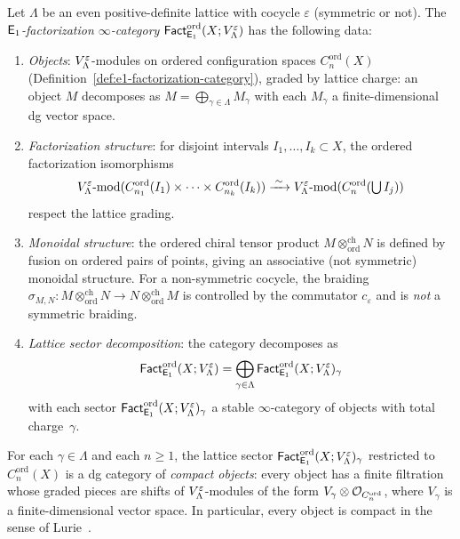 \begin{construction}
\label{constr:lattice:e1-fact-cat}
Let $\Lambda$ be an even positive-definite lattice with cocycle
$\varepsilon$ (symmetric or not).  The \emph{$\mathsf{E}_1$-factorization
$\infty$-category} $\mathsf{Fact}_{\mathsf{E}_1}^{\mathrm{ord}}(X; V_\Lambda^\varepsilon)$
has the following data:
\begin{enumerate}[label=(\roman*)]
\item \emph{Objects}: $V_\Lambda^\varepsilon$-modules on ordered
  configuration spaces $C_n^{\mathrm{ord}}(X)$
  (Definition~\ref{def:e1-factorization-category}), graded by
  lattice charge: an object $M$ decomposes as
  $M = \bigoplus_{\gamma \in \Lambda} M_\gamma$ with each
  $M_\gamma$ a finite-dimensional dg vector space.
\item \emph{Factorization structure}: for disjoint intervals
  $I_1, \ldots, I_k \subset X$, the ordered factorization isomorphisms
  \[
  V_\Lambda^\varepsilon\text{-mod}(
    C_{n_1}^{\mathrm{ord}}(I_1) \times \cdots
    \times C_{n_k}^{\mathrm{ord}}(I_k))
  \xrightarrow{\;\sim\;}
  V_\Lambda^\varepsilon\text{-mod}(
    C_n^{\mathrm{ord}}(\textstyle\bigcup I_j))
  \]
  respect the lattice grading.
\item \emph{Monoidal structure}: the ordered chiral tensor product
  $M \otimes^{\mathrm{ch}}_{\mathrm{ord}} N$ is defined by fusion on
  ordered pairs of points, giving an associative (not symmetric)
  monoidal structure.  For a non-symmetric cocycle, the braiding
  $\sigma_{M,N} \colon M \otimes^{\mathrm{ch}}_{\mathrm{ord}} N
  \to N \otimes^{\mathrm{ch}}_{\mathrm{ord}} M$
  is controlled by the commutator $c_\varepsilon$ and is \emph{not}
  a symmetric braiding.
\item \emph{Lattice sector decomposition}: the category decomposes as
  \[
  \mathsf{Fact}_{\mathsf{E}_1}^{\mathrm{ord}}(X; V_\Lambda^\varepsilon)
  = \bigoplus_{\gamma \in \Lambda}
    \mathsf{Fact}_{\mathsf{E}_1}^{\mathrm{ord}}(X; V_\Lambda^\varepsilon)_\gamma
  \]
  with each sector $\mathsf{Fact}_{\mathsf{E}_1}^{\mathrm{ord}}(X; V_\Lambda^\varepsilon)_\gamma$
  a stable $\infty$-category of objects with total charge~$\gamma$.
\end{enumerate}
\end{construction}

\begin{proposition}
\label{prop:lattice:sectorwise-compactness}
For each $\gamma \in \Lambda$ and each $n \geq 1$, the lattice
sector $\mathsf{Fact}_{\mathsf{E}_1}^{\mathrm{ord}}(X; V_\Lambda^\varepsilon)_\gamma$ restricted
to $C_n^{\mathrm{ord}}(X)$ is a dg category of
\emph{compact objects}: every object has a finite filtration whose
graded pieces are shifts of
$V_\Lambda^\varepsilon$-modules of the form
$V_\gamma \otimes \mathcal{O}_{C_n^{\mathrm{ord}}}$, where $V_\gamma$ is
a finite-dimensional vector space.  In particular, every object is
compact in the sense of Lurie~\cite{LurieHA}.
\end{proposition}

